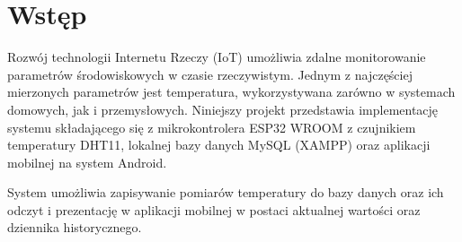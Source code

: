 \chapter*{Wstęp}

Rozwój technologii Internetu Rzeczy (IoT) umożliwia zdalne monitorowanie parametrów środowiskowych w czasie rzeczywistym. Jednym z najczęściej mierzonych parametrów jest temperatura, wykorzystywana zarówno w systemach domowych, jak i przemysłowych. Niniejszy projekt przedstawia implementację systemu składającego się z mikrokontrolera ESP32 WROOM z czujnikiem temperatury DHT11, lokalnej bazy danych MySQL (XAMPP) oraz aplikacji mobilnej na system Android.

System umożliwia zapisywanie pomiarów temperatury do bazy danych oraz ich odczyt i prezentację w aplikacji mobilnej w postaci aktualnej wartości oraz dziennika historycznego.
